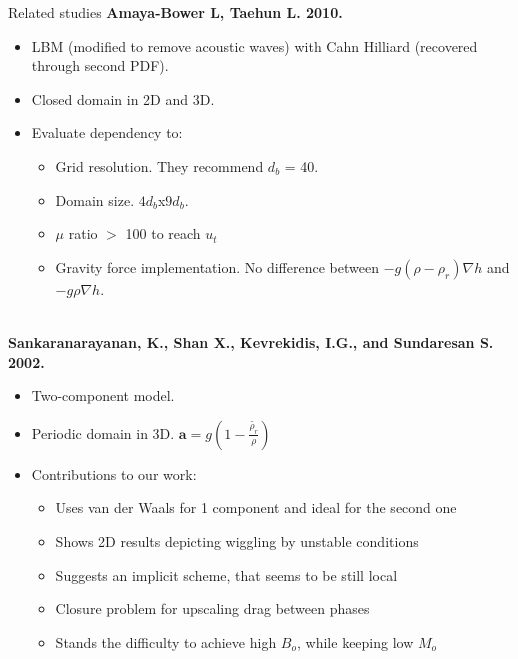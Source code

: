 \documentclass[8pt]{beamer}
\begin{document}
	\begin{frame}{Related studies}
		\textbf{Amaya-Bower L, Taehun L. 2010.}~\\
		\begin{itemize}
			\item LBM (modified to remove acoustic waves) with Cahn Hilliard (recovered through second PDF).
			\item Closed domain in 2D and 3D.
			\item Evaluate dependency to:
			\begin{itemize}
				\item Grid resolution. They recommend $d_b$ = 40.
				\item Domain size. $4d_b$x$9d_b$.
				\item $\mu$ ratio $>$ 100 to reach $u_t$
				\item Gravity force implementation. No difference between $-g (\rho-\rho_r) \nabla h$ and $-g \rho \nabla h$. 
			\end{itemize}  
		\end{itemize}
		~\\
		\textbf{Sankaranarayanan, K., Shan X., Kevrekidis, I.G., and Sundaresan S. 2002.}~\\
		\begin{itemize}
			\item Two-component model. 
			\item Periodic domain in 3D. $\mathbf{a} = g(1-\frac{\tilde{\rho_r}}{\rho})$
			\item Contributions to our work:
			\begin{itemize}
				\item Uses van der Waals for 1 component and ideal for the second one
				\item Shows 2D results depicting wiggling by unstable conditions
				\item Suggests an implicit scheme, that seems to be still local
				\item Closure problem for upscaling drag between phases
				\item Stands the difficulty to achieve high $B_o$, while keeping low $M_o$
			\end{itemize}  
		\end{itemize}
	
	\end{frame}
	
\end{document}
